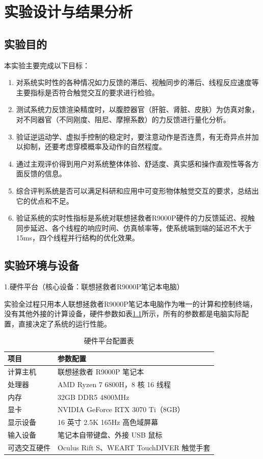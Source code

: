 
\chapter{实验设计与结果分析}

\section{实验目的}

本实验主要完成以下目标：

\begin{enumerate}
\item
  对系统实时性的各种情况如力反馈的滞后、视触同步的滞后、线程反应速度等主要指标是否符合触觉交互的要求进行检验。
\item
  测试系统力反馈渲染精度时，以腹腔器官（肝脏、肾脏、皮肤）为仿真对象，对不同器官（不同刚度、阻尼、摩擦系数）的力反馈进行量化分析。
\item
  验证逆运动学、虚拟手控制的稳定时，要注意动作是否连贯，有无奇异点并加以抑制，还要考虑穿模概率及动作的自然程度。
\item
  通过主观评价得到用户对系统整体体验、舒适度、真实感和操作直观性等各方面反馈的信息。
\item
  综合评判系统是否可以满足科研和应用中可变形物体触觉交互的要求，总结出它的优点和不足。
\item
  验证系统的实时性指标是系统对联想拯救者R9000P硬件的力反馈延迟、视触同步延迟、各个线程的响应时间、仿真帧率等，使系统端到端的延迟不大于15ms，四个线程并行结构的优化效果。
\end{enumerate}

\section{实验环境与设备}

1.硬件平台（核心设备：联想拯救者R9000P笔记本电脑）

实验全过程只用本人联想拯救者R9000P笔记本电脑作为唯一的计算和控制终端，没有其他外接的计算设备，硬件参数如表\ref{tab:5-1}所示，所有的参数都是电脑实际配置，直接决定了系统的运行性能。

\begin{table}[H]
\centering
\caption{硬件平台配置表}
\label{tab:5-1}
\footnotesize
\renewcommand{\arraystretch}{1.18}
\begin{tabularx}{\textwidth}{p{}X}
\toprule
项目 & 参数配置 \\
\midrule
计算主机 & 联想拯救者 R9000P 笔记本 \\
处理器 & AMD Ryzen 7 6800H，8 核 16 线程 \\
内存 & 32GB DDR5 4800MHz \\
显卡 & NVIDIA GeForce RTX 3070 Ti（8GB） \\
显示设备 & 16 英寸 2.5K 165Hz 高色域屏幕 \\
输入设备 & 笔记本自带键盘、外接 USB 鼠标 \\
可选交互硬件 & Oculus Rift S、WEART TouchDIVER 触觉手套 \\
\bottomrule
\end{tabularx}
\end{table}



